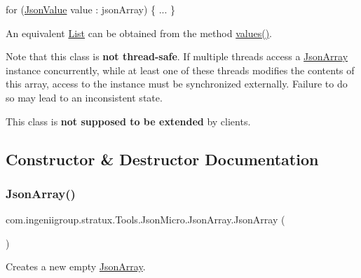 \begin{DoxyPre}
for (\hyperlink{classcom_1_1ingeniigroup_1_1stratux_1_1_tools_1_1_json_micro_1_1_json_value}{JsonValue} value : jsonArray) \{
  ...
\}
\end{DoxyPre}
 

An equivalent \hyperlink{}{List} can be obtained from the method \hyperlink{classcom_1_1ingeniigroup_1_1stratux_1_1_tools_1_1_json_micro_1_1_json_array_a266a0d9090082147fc38fc75bbaba0e1}{values()}. 

Note that this class is {\bfseries not thread-\/safe}. If multiple threads access a {\ttfamily \hyperlink{classcom_1_1ingeniigroup_1_1stratux_1_1_tools_1_1_json_micro_1_1_json_array}{Json\+Array}} instance concurrently, while at least one of these threads modifies the contents of this array, access to the instance must be synchronized externally. Failure to do so may lead to an inconsistent state. 

This class is {\bfseries not supposed to be extended} by clients. 

\subsection{Constructor \& Destructor Documentation}
\mbox{\label{classcom_1_1ingeniigroup_1_1stratux_1_1_tools_1_1_json_micro_1_1_json_array_abcc65f70ef276c1e8a1edbc2959554f5}} 
\subsubsection{\texorpdfstring{Json\+Array()}{JsonArray()}\hspace{0.1cm}{\footnotesize\ttfamily [1/2]}}
{\footnotesize\ttfamily com.\+ingeniigroup.\+stratux.\+Tools.\+Json\+Micro.\+Json\+Array.\+Json\+Array (\begin{DoxyParamCaption}{ }\end{DoxyParamCaption})}

Creates a new empty \hyperlink{classcom_1_1ingeniigroup_1_1stratux_1_1_tools_1_1_json_micro_1_1_json_array}{Json\+Array}. \mbox{\label{classcom_1_1ingeniigroup_1_1stratux_1_1_tools_1_1_json_micro_1_1_json_array_a931f22a8ba90cd4732339b9eedf891fa}} 
